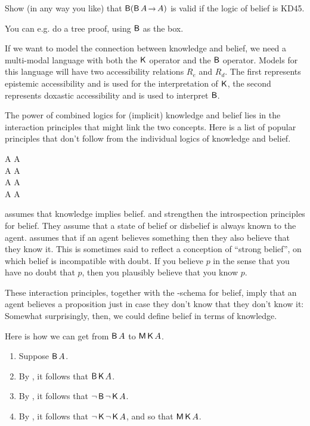 \begin{exercise}
  Show (in any way you like) that $\Bel(\Bel A \to A)$ is valid if the logic of
  belief is KD45.
\end{exercise}
\begin{solution}
  You can e.g. do a tree proof, using $\operatorname{\mathsf{B}}$ as the box.
\end{solution}

If we want to model the connection between knowledge and belief, we need a
multi-modal language with both the $\operatorname{\mathsf{K}{}}$ operator and the $\operatorname{\mathsf{B}}$ operator.
Models for this language will have two accessibility relations $R_{e}$ and
$R_{d}$. The first represents epistemic accessibility and is used for the
interpretation of $\operatorname{\mathsf{K}{}}$, the second represents doxastic accessibility and is
used to interpret $\operatorname{\mathsf{B}}$.

The power of combined logics for (implicit) knowledge and belief lies in the
interaction principles that might link the two concepts. Here is a list of
popular principles that don't follow from the individual logics of knowledge and
belief.
\begin{principles}
   \Kn A \to \Bel A\\
   \Bel A \to \Kn\Bel A\\
   \neg \Bel A \to \Kn\neg \Bel A\\
   \Bel A \to \Bel \Kn A
\end{principles}

 assumes that knowledge implies belief.  and  strengthen
the introspection principles for belief. They assume that a state of belief or
disbelief is always known to the agent.  assumes that if an agent
believes something then they also believe that they know it. This is sometimes
said to reflect a conception of ``strong belief'', on which belief is
incompatible with doubt. If you believe $p$ in the sense that you have no doubt
that $p$, then you plausibly believe that you know $p$.

These interaction principles, together with the -schema for belief, imply
that an agent believes a proposition just in case they don't know that they
don't know it:
%
%
Somewhat surprisingly, then, we could define belief in terms of knowledge.

Here is how we can get from $\operatorname{\mathsf{B}} A$ to $\operatorname{\mathsf{M}}\operatorname{\mathsf{K}{}} A$.
%
\begin{enumerate}[leftmargin=10mm]
  \itemsep-1mm
\item Suppose $\operatorname{\mathsf{B}} A$.
\item By , it follows that $\operatorname{\mathsf{B}} \operatorname{\mathsf{K}{}} A$.
\item By , it follows that $\neg \operatorname{\mathsf{B}} \neg \operatorname{\mathsf{K}{}} A$.
\item By , it follows that $\neg \operatorname{\mathsf{K}{}} \neg \operatorname{\mathsf{K}{}} A$, and so that $\operatorname{\mathsf{M}}\operatorname{\mathsf{K}{}} A$.
\end{enumerate}

